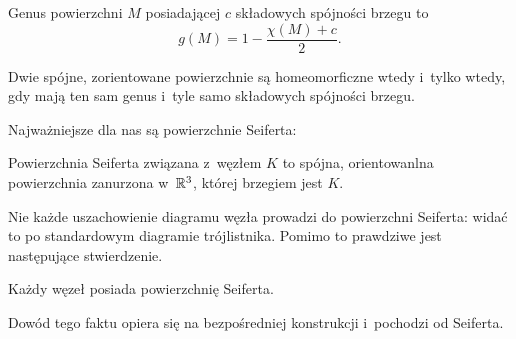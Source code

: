 \begin{definition}
    Genus powierzchni $M$ posiadającej $c$ składowych spójności brzegu to
    \[
        g(M) = 1 - \frac{\chi(M) + c}{2}.
    \]
\end{definition}

\begin{proposition}
    Dwie spójne, zorientowane powierzchnie są homeomorficzne wtedy i~tylko
    wtedy, gdy mają ten sam genus i~tyle samo składowych spójności brzegu.
\end{proposition}

Najważniejsze dla nas są powierzchnie Seiferta:

\begin{definition}
    Powierzchnia Seiferta związana z~węzłem $K$ to spójna,
    orientowanlna powierzchnia zanurzona w~$\mathbb R^3$, której brzegiem jest $K$.
\end{definition}


Nie każde uszachowienie diagramu węzła prowadzi do powierzchni Seiferta:
widać to po standardowym diagramie trójlistnika.
Pomimo to prawdziwe jest następujące stwierdzenie.

\begin{proposition}
    Każdy węzeł posiada powierzchnię Seiferta.
\end{proposition}

Dowód tego faktu opiera się na bezpośredniej konstrukcji i~pochodzi od Seiferta.

